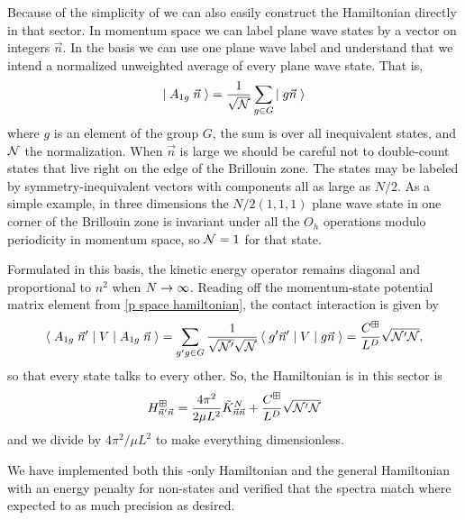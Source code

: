 Because of the simplicity of \Aoneg we can also easily construct the Hamiltonian directly in that sector.
In momentum space we can label plane wave states by a vector on integers $\vec{n}$.
In the \Aoneg basis we can use one plane wave label and understand that we intend a normalized unweighted average of every plane wave state.
That is,
\begin{equation}
    \left|\;A_{1g}\; \vec{n}\;\right\rangle = \frac{1}{\sqrt{\mathcal{N}}} \sum_{g \in G} \left|\; g\vec{n}\;\right\rangle
\end{equation}
where $g$ is an element of the group $G$, the sum is over all inequivalent states, and $\mathcal{N}$ the normalization.
When $\vec{n}$ is large we should be careful not to double-count states that live right on the edge of the Brillouin zone.
The states may be labeled by symmetry-inequivalent vectors with components all as large as $N/2$.
As a simple example, in three dimensions the $N/2(1,1,1)$ plane wave state in one corner of the Brillouin zone is invariant under all the $O_h$ operations modulo periodicity in momentum space, so $\mathcal{N}=1$ for that state.

Formulated in this basis, the kinetic energy operator remains diagonal and proportional to $n^2$ when $N\rightarrow\infty$.
Reading off the momentum-state potential matrix element from \eqref{p space hamiltonian}, the contact interaction is given by
\begin{equation}
    \left\langle\;A_{1g}\; \vec{n}'\;\middle|\;V\;\middle|\;A_{1g}\; \vec{n}\;\right\rangle
    =
    \sum_{g'g \in G}
        \frac{1}{\sqrt{\mathcal{N}'}\sqrt{\mathcal{N}}} \left\langle\;g'\vec{n}'\;\middle|\;V\;\middle|\;g\vec{n}\;\right\rangle
    =
    \frac{C^\boxplus}{L^D} \sqrt{\mathcal{N}'\mathcal{N}},
\end{equation}
so that every \Aoneg state talks to every other.
So, the Hamiltonian is in this sector is
\begin{equation}
    H_{\vec{n}'\vec{n}}^\boxplus = \frac{4 \pi^2}{2\mu L^2} \tilde K_{\vec n \vec n}^{N} + \frac{C^\boxplus}{L^D} \sqrt{\mathcal{N}'\mathcal{N}}
\end{equation}
and we divide by $4\pi^2/\mu L^2$ to make everything dimensionless.

We have implemented both this \Aoneg-only Hamiltonian and the general Hamiltonian with an energy penalty for non-\Aoneg states and verified that the spectra match where expected to as much precision as desired.

